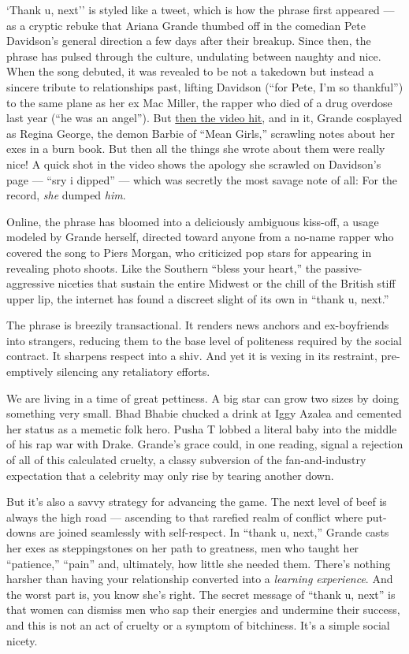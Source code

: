 `Thank u, next'' is styled like a tweet, which is how the phrase first
appeared --- as a cryptic rebuke that Ariana Grande thumbed off in the
comedian Pete Davidson's general direction a few days after their
breakup. Since then, the phrase has pulsed through the culture,
undulating between naughty and nice. When the song debuted, it was
revealed to be not a takedown but instead a sincere tribute to
relationships past, lifting Davidson (``for Pete, I'm so thankful'') to
the same plane as her ex Mac Miller, the rapper who died of a drug
overdose last year (``he was an angel''). But
\href{https://www.youtube.com/watch?v=gl1aHhXnN1k}{then the video hit},
and in it, Grande cosplayed as Regina George, the demon Barbie of ``Mean
Girls,'' scrawling notes about her exes in a burn book. But then all the
things she wrote about them were really nice! A quick shot in the video
shows the apology she scrawled on Davidson's page --- ``sry i dipped''
--- which was secretly the most savage note of all: For the record,
\emph{she} dumped \emph{him}.

Online, the phrase has bloomed into a deliciously ambiguous kiss-off, a
usage modeled by Grande herself, directed toward anyone from a no-name
rapper who covered the song to Piers Morgan, who criticized pop stars
for appearing in revealing photo shoots. Like the Southern ``bless your
heart,'' the passive-aggressive niceties that sustain the entire Midwest
or the chill of the British stiff upper lip, the internet has found a
discreet slight of its own in ``thank u, next.''

The phrase is breezily transactional. It renders news anchors and
ex-boyfriends into strangers, reducing them to the base level of
politeness required by the social contract. It sharpens respect into a
shiv. And yet it is vexing in its restraint, pre-emptively silencing any
retaliatory efforts.

We are living in a time of great pettiness. A big star can grow two
sizes by doing something very small. Bhad Bhabie chucked a drink at Iggy
Azalea and cemented her status as a memetic folk hero. Pusha T lobbed a
literal baby into the middle of his rap war with Drake. Grande's grace
could, in one reading, signal a rejection of all of this calculated
cruelty, a classy subversion of the fan-and-industry expectation that a
celebrity may only rise by tearing another down.

But it's also a savvy strategy for advancing the game. The next level of
beef is always the high road --- ascending to that rarefied realm of
conflict where put-downs are joined seamlessly with self-respect. In
``thank u, next,'' Grande casts her exes as steppingstones on her path
to greatness, men who taught her ``patience,'' ``pain'' and, ultimately,
how little she needed them. There's nothing harsher than having your
relationship converted into a \emph{learning experience}. And the worst
part is, you know she's right. The secret message of ``thank u, next''
is that women can dismiss men who sap their energies and undermine their
success, and this is not an act of cruelty or a symptom of bitchiness.
It's a simple social nicety.

